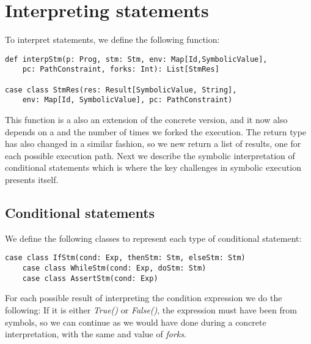 \section{Interpreting statements}

To interpret statements, we define the following function:

\begin{lstlisting}[style=simple]
def interpStm(p: Prog, stm: Stm, env: Map[Id,SymbolicValue], 
	pc: PathConstraint, forks: Int): List[StmRes]
			  
case class StmRes(res: Result[SymbolicValue, String], 
	env: Map[Id, SymbolicValue], pc: PathConstraint)
\end{lstlisting}

This function is a also an extension of the concrete version, and it now also depends on a \pc and the number of times we forked the execution. The return type has also changed in a similar fashion, so we new return a list of results, one for each possible execution path. Next we describe the symbolic interpretation of conditional statements which is where the key challenges in symbolic execution presents itself. 


\iffalse

\subsection{Assignment statements}
Given an \textsl{Assignment}-statement \textsl{AssignStm(v: Var, e: Exp)}, we interpret the expression $e$, and get a list of results for each possible execution path. For each of these results, we return the value of the expression and an updated environment. If the expression resulted in an error, or a unit 
value, we instead return error and the original environment. 

\fi

\subsection{Conditional statements}

We define the following classes to represent each type of conditional statement:

\begin{lstlisting}[style=simple]
	case class IfStm(cond: Exp, thenStm: Stm, elseStm: Stm)
	case class WhileStm(cond: Exp, doStm: Stm)
	case class AssertStm(cond: Exp)
\end{lstlisting}
For each possible result of interpreting the condition expression we do the following: If it is either \textsl{True()} or \textsl{False()}, the expression must have been from symbols, so we can continue as we would have done during a concrete interpretation, with the same \pc and value of \textsl{forks}.

